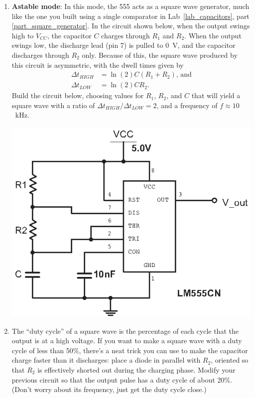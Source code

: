 \begin{enumerate}[wide]
\item \textbf{Astable mode}: In this mode, the 555 acts as a square wave generator, much like the one you built using a single comparator in Lab~\ref{lab_capacitors}, part \ref{part_square_generator}.  In the circuit shown below, when the output swings high to $V_{CC}$, the capacitor $C$ charges through $R_1$ and $R_2$.  When the output swings low, the discharge lead (pin 7) is pulled to 0~V, and the capacitor discharges through $R_2$ only.  Because of this, the square wave produced by this circuit is asymmetric, with the dwell times given by
\begin{align*}
\Delta t_{HIGH} &= \ln (2) C(R_1 + R_2) \textrm{, and} \\
\Delta t_{LOW} &=\ln (2) CR_2.
\end{align*}
Build the circuit below, choosing values for $R_1$, $R_2$, and $C$ that will yield a square wave with a ratio of 
$\Delta t_{HIGH} / \Delta t_{LOW} =2$, and a frequency of $f \approx 10$~kHz. \label{part_astable}
\begin{center}
\includegraphics{timers/astable_555.eps}
\end{center}

\item The ``duty cycle'' of a square wave is the percentage of each cycle that the output is at a high voltage.  If you want to make a square wave with a duty cycle of less than 50\%, there's a neat trick you can use to make the capacitor charge faster than it discharges: place a diode in parallel with $R_2$, oriented so that $R_2$ is effectively shorted out during the charging phase.  Modify your previous circuit so that the output pulse has a duty cycle of about 20\%.  (Don't worry about its frequency, just get the duty cycle close.)


\end{enumerate}
